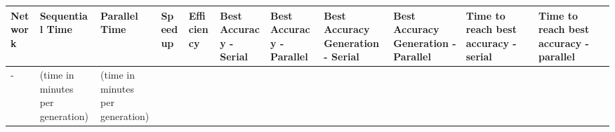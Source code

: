 \documentclass[]{article}
\begin{document}
\begin{longtable}[c]{@{}lllllllllll@{}}
\toprule
\begin{minipage}[b]{0.07\columnwidth}\raggedright\strut
Network
\strut\end{minipage} &
\begin{minipage}[b]{0.07\columnwidth}\raggedright\strut
Sequential Time
\strut\end{minipage} &
\begin{minipage}[b]{0.07\columnwidth}\raggedright\strut
Parallel Time
\strut\end{minipage} &
\begin{minipage}[b]{0.07\columnwidth}\raggedright\strut
Speedup
\strut\end{minipage} &
\begin{minipage}[b]{0.07\columnwidth}\raggedright\strut
Efficiency
\strut\end{minipage} &
\begin{minipage}[b]{0.07\columnwidth}\raggedright\strut
Best Accuracy - Serial
\strut\end{minipage} &
\begin{minipage}[b]{0.07\columnwidth}\raggedright\strut
Best Accuracy - Parallel
\strut\end{minipage} &
\begin{minipage}[b]{0.07\columnwidth}\raggedright\strut
Best Accuracy Generation - Serial
\strut\end{minipage} &
\begin{minipage}[b]{0.07\columnwidth}\raggedright\strut
Best Accuracy Generation - Parallel
\strut\end{minipage} &
\begin{minipage}[b]{0.07\columnwidth}\raggedright\strut
Time to reach best accuracy - serial
\strut\end{minipage} &
\begin{minipage}[b]{0.07\columnwidth}\raggedright\strut
Time to reach best accuracy - parallel
\strut\end{minipage}\tabularnewline
\midrule
\endhead
\begin{minipage}[t]{0.07\columnwidth}\raggedright\strut
-
\strut\end{minipage} &
\begin{minipage}[t]{0.07\columnwidth}\raggedright\strut
(time in minutes per generation)
\strut\end{minipage} &
\begin{minipage}[t]{0.07\columnwidth}\raggedright\strut
(time in minutes per generation)

\end{minipage}
\end{longtable}
\end{document}
